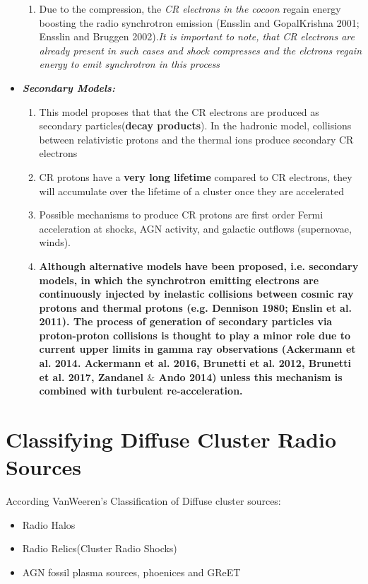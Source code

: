 \documentclass[11pt]{report}
\newcommand{\tbf}[1]{\textbf{#1}}
\newcommand{\tit}[1]{\textit{#1}}
\begin{document}
\begin{itemize}
\begin{enumerate}
 \item Due to the compression, the \tit{CR electrons in the cocoon} regain energy boosting the radio synchrotron emission (Ensslin and GopalKrishna 2001; Ensslin and Bruggen 2002).\tit{It is important to note, that CR electrons are already present in such cases and shock compresses and the elctrons regain energy to emit synchrotron in this process}
 \end{enumerate}
\item \tit{\tbf{Secondary Models:}}
\begin{enumerate}
\item This model proposes that that the CR electrons are produced as secondary particles(\tbf{decay products}). In the hadronic model, collisions between relativistic protons and the thermal ions produce secondary CR electrons
\item  CR protons have a \tbf{very long lifetime} compared to CR electrons, they will accumulate over the lifetime of a cluster once they are accelerated
\item Possible mechanisms to produce CR protons are first order Fermi acceleration at shocks, AGN activity, and galactic outflows (supernovae, winds).
\item \tbf{Although alternative models have been proposed, i.e. secondary models, in which the synchrotron emitting electrons are continuously injected by inelastic collisions between cosmic ray protons and thermal protons (e.g. Dennison 1980; Enslin et al. 2011). The process of generation of secondary particles via proton-proton collisions is thought to play a minor role due to current upper limits in gamma ray observations (Ackermann et al. 2014. Ackermann et al. 2016, Brunetti et al. 2012, Brunetti et al. 2017, Zandanel $\&$ Ando 2014) unless this mechanism is combined with turbulent re-acceleration.}
\end{enumerate}

 \end{itemize}
 \section{Classifying Diffuse Cluster Radio Sources}
According VanWeeren's Classification of Diffuse cluster sources:
\begin{itemize}
\item Radio Halos
\item Radio Relics(Cluster Radio Shocks)
\item AGN fossil plasma sources, phoenices and GReET
\end{itemize}
\end{document}
